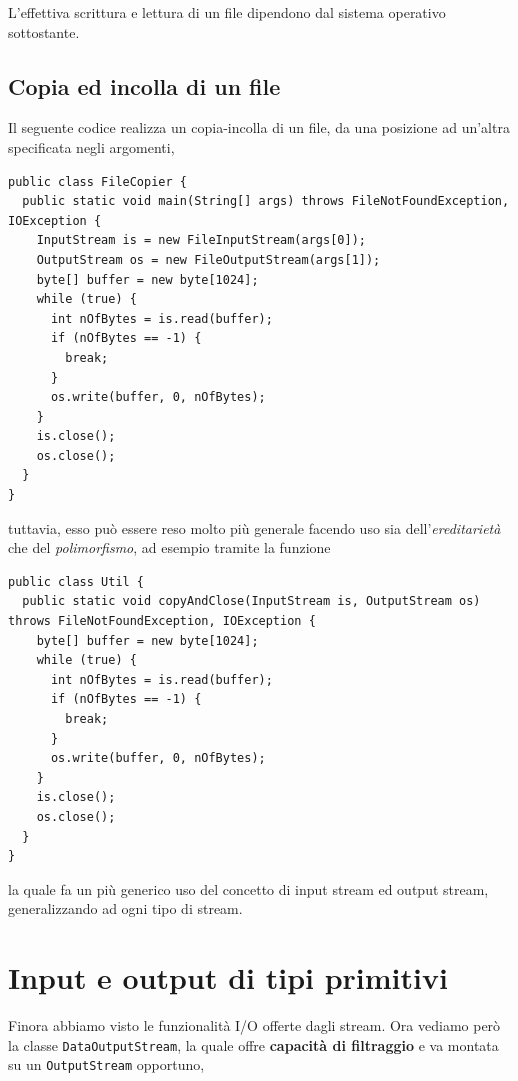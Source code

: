 \documentclass[\fontsizeclass,twocolumn]{\classname}
\theoremstyle{definition}
\theoremstyle{definition}
\begin{document}
L'effettiva scrittura e lettura di un file dipendono dal sistema operativo
sottostante.

\subsection{Copia ed incolla di un file}

Il seguente codice realizza un copia-incolla di un file, da una posizione ad
un'altra specificata negli argomenti,


\begin{lstlisting}
public class FileCopier {
  public static void main(String[] args) throws FileNotFoundException, IOException {
    InputStream is = new FileInputStream(args[0]);
    OutputStream os = new FileOutputStream(args[1]);
    byte[] buffer = new byte[1024];
    while (true) {
      int nOfBytes = is.read(buffer);
      if (nOfBytes == -1) {
        break;
      }
      os.write(buffer, 0, nOfBytes);
    }
    is.close();
    os.close();
  }
}
\end{lstlisting}


tuttavia, esso può essere reso molto più generale facendo uso sia
dell'\emph{ereditarietà} che del \emph{polimorfismo}, ad esempio tramite la
funzione

\begin{lstlisting}
public class Util {
  public static void copyAndClose(InputStream is, OutputStream os) throws FileNotFoundException, IOException {
    byte[] buffer = new byte[1024];
    while (true) {
      int nOfBytes = is.read(buffer);
      if (nOfBytes == -1) {
        break;
      }
      os.write(buffer, 0, nOfBytes);
    }
    is.close();
    os.close();
  }
}
\end{lstlisting}

la quale fa un più generico uso del concetto di input stream ed output stream,
generalizzando ad ogni tipo di stream.

\section{Input e output di tipi primitivi}

Finora abbiamo visto le funzionalità I/O offerte dagli stream. Ora vediamo però
la classe \texttt{DataOutputStream}, la quale offre \textbf{capacità di
filtraggio} e va montata su un \texttt{Output\-Stream} opportuno,
\end{document}
